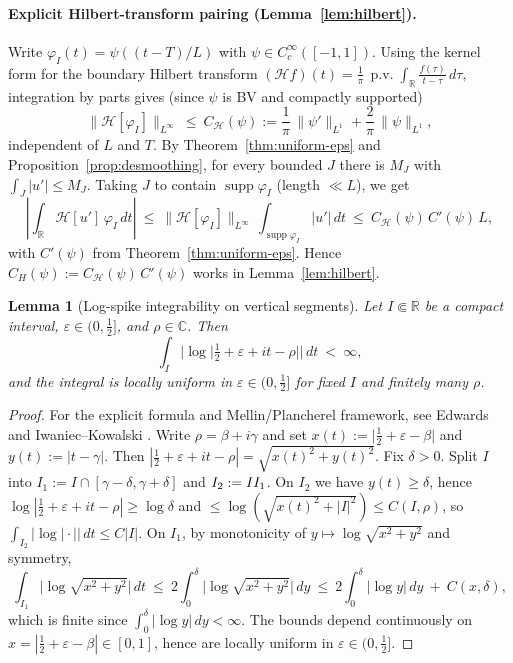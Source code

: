 \documentclass[11pt]{article}
\newtheorem{lemma}[theorem]{Lemma}
\theoremstyle{definition}
\theoremstyle{remark}
\newcommand{\C}{\mathbb{C}}
\newcommand{\R}{\mathbb{R}}
\begin{document}
\paragraph{Explicit Hilbert-transform pairing (Lemma~\ref{lem:hilbert}).}
Write $\varphi_I(t)=\psi((t-T)/L)$ with $\psi\in C_c^\infty([-1,1])$. Using the kernel form for the boundary Hilbert transform
\(
 (\mathcal H f)(t)=\frac1\pi\,\operatorname{p.v.}\!\int_\R \frac{f(\tau)}{t-\tau}\,d\tau,
\)
integration by parts gives (since $\psi$ is BV and compactly supported)
\[
 \|\mathcal H[\varphi_I]\|_{L^\infty}\ \le\ C_{\mathcal H}(\psi):=\frac{1}{\pi}\,\|\psi'\|_{L^1}+\frac{2}{\pi}\,\|\psi\|_{L^1},
\]
independent of $L$ and $T$. By Theorem~\ref{thm:uniform-eps} and Proposition~\ref{prop:desmoothing}, for every bounded $J$ there is $M_J$ with $\int_J|u'|\le M_J$. Taking $J$ to contain $\operatorname{supp}\varphi_I$ (length $\ll L$), we get
\[
 \left|\int_\R \mathcal H[u']\,\varphi_I\,dt\right|\ \le\ \|\mathcal H[\varphi_I]\|_{L^\infty}\,\int_{\operatorname{supp}\varphi_I}\!|u'|\,dt\ \le\ C_{\mathcal H}(\psi)\,C'(\psi)\,L,
\]
with $C'(\psi)$ from Theorem~\ref{thm:uniform-eps}. Hence $C_H(\psi):=C_{\mathcal H}(\psi)\,C'(\psi)$ works in Lemma~\ref{lem:hilbert}.


\begin{lemma}[Log-spike integrability on vertical segments]\label{lem:log-spike-int}
Let $I\Subset\R$ be a compact interval, $\varepsilon\in(0,\tfrac12]$, and $\rho\in\C$. Then
\[
 \int_I \big|\log\big|\tfrac12+\varepsilon+it-\rho\big|\big|\,dt\ <\ \infty,
\]
and the integral is locally uniform in $\varepsilon\in(0,\tfrac12]$ for fixed $I$ and finitely many $\rho$.
\end{lemma}
\begin{proof}
For the explicit formula and Mellin/Plancherel framework, see Edwards \cite[Ch.~1, §5]{Edwards} and Iwaniec--Kowalski \cite[Ch.~5]{IwaniecKowalski}.
Write $\rho=\beta+i\gamma$ and set $x(t):=\big|\tfrac12+\varepsilon-\beta\big|$ and $y(t):=|t-\gamma|$. Then $|\tfrac12+\varepsilon+it-\rho|=\sqrt{x(t)^2+y(t)^2}$. Fix $\delta>0$. Split $I$ into $I_1:=I\cap[\gamma-\delta,\gamma+\delta]$ and $I_2:=I\\I_1$. On $I_2$ we have $y(t)\ge \delta$, hence $\log|\tfrac12+\varepsilon+it-\rho|\ge \log\delta$ and $\le \log(\sqrt{x(t)^2+|I|^2})\le C(I,\rho)$, so $\int_{I_2}|\log|\cdot||\,dt\le C|I|$. On $I_1$, by monotonicity of $y\mapsto \log\sqrt{x^2+y^2}$ and symmetry,
\[
 \int_{I_1}\!\big|\log\sqrt{x^2+y^2}\big|\,dt\ \le\ 2\int_0^{\delta} \big|\log\sqrt{x^2+y^2}\big|\,dy\ \le\ 2\int_0^{\delta} \big|\log y\big|\,dy\ +\ C(x,\delta),
\]
which is finite since $\int_0^{\delta}|\log y|\,dy<\infty$. The bounds depend continuously on $x=|\tfrac12+\varepsilon-\beta|\in[0,1]$, hence are locally uniform in $\varepsilon\in(0,\tfrac12]$.
\end{proof}
\end{document}
